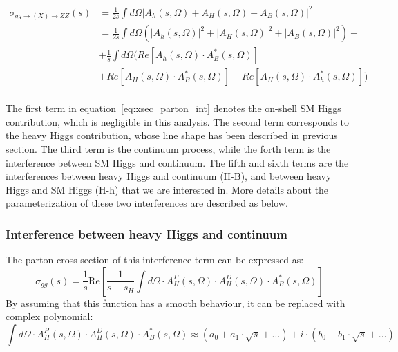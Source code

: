 \begingroup
\begin{equation} \label{eq:xsec_parton_int}
\begin{split}
    \sigma_{gg \to (X) \to ZZ} (s) &= \frac{1}{2s}  \int d \Omega \left | A_h(s,\Omega) + A_H(s,\Omega) + A_B(s,\Omega) \right |^2 \\
    &= \frac{1}{2s}  \int d \Omega  \left (  \left | A_h(s,\Omega)  \right |^2 +  \left | A_H(s,\Omega)  \right |^2 +  \left | A_B(s,\Omega)  \right |^2  \right )  + \\
    &+ \frac{1}{s}  \int d \Omega  \big( Re \left [ A_h(s,\Omega) \cdot A^*_B(s,\Omega)  \right ] \\
    &+ Re \left [ A_H(s,\Omega) \cdot A^*_B(s,\Omega)  \right ] + Re \left [ A_H(s,\Omega) \cdot A^*_h(s,\Omega)  \right ]  \big) \\
\end{split}
\end{equation}
\endgroup

The first term in equation~\ref{eq:xsec_parton_int} denotes the on-shell SM Higgs contribution, which is negligible in this analysis.
The second term corresponds to the heavy Higgs contribution, whose line shape has been described in previous section.
The third term is the \ggZZ continuum process, while the forth term is the interference between SM Higgs and \ggZZ continuum.
The fifth and sixth terms are the interferences between heavy Higgs and \ggZZ continuum (H-B), and between heavy Higgs and SM Higgs (H-h) that we are interested in.
More details about the parameterization of these two interferences are described as below.

\subsubsection{Interference between heavy Higgs and \ggZZ continuum}

The parton cross section of this interference term can be expressed as:
\begin{equation}
	\sigma_{gg} (s) = \frac{1}{s} \mathrm{Re} \left [ \frac{1}{s-s_H}  \int d \Omega \cdot A_H^P(s,\Omega)  \cdot A_H^D(s,\Omega) \cdot A^*_B(s,\Omega)  \right ]
\end{equation}
By assuming that this function has a smooth behaviour, it can be replaced with complex polynomial:
\begin{equation}
    \int d \Omega \cdot A_H^P(s,\Omega)  \cdot A_H^D(s,\Omega) \cdot A^*_B(s,\Omega)  \approx  (a_0 + a_1 \cdot \sqrt{s} + \dots) + i \cdot (b_0 + b_1 \cdot \sqrt{s} + \dots)
\end{equation}

